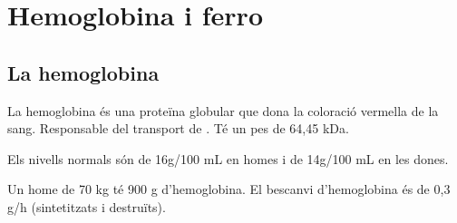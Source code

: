 \section{Hemoglobina i ferro}

\subsection{La hemoglobina}
La hemoglobina és una proteïna globular que dona la coloració vermella
de la sang. Responsable del transport de . Té un pes de  64,45
kDa.

Els nivells normals són de 16g/100 mL en homes i de 14g/100 mL en les dones.

Un home de 70 kg té 900 g d'hemoglobina. El bescanvi d'hemoglobina és
de 0,3 g/h (sintetitzats i destruïts).

